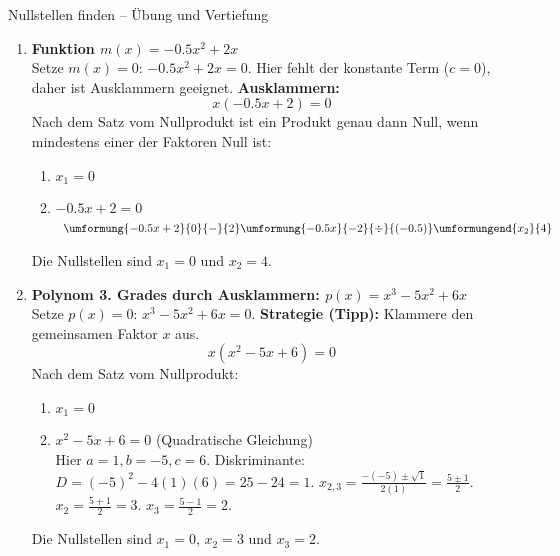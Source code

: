 \begin{loesungsumgebung}{Nullstellen finden – Übung und Vertiefung}
\begin{enumerate}[label=(\alph*)]
    \item \textbf{Funktion $m(x) = -0.5x^2 + 2x$} \\
    Setze $m(x)=0$: $-0.5x^2 + 2x = 0$. Hier fehlt der konstante Term ($c=0$), daher ist Ausklammern geeignet.
    \textbf{Ausklammern:}
    $$ x(-0.5x + 2) = 0 $$
    Nach dem Satz vom Nullprodukt ist ein Produkt genau dann Null, wenn mindestens einer der Faktoren Null ist:
    \begin{enumerate}
        \item $x_1 = 0$
        \item $-0.5x + 2 = 0$
            $$
            \begin{array}{r c l c l}
            \umformung{-0.5x + 2}{0}{-}{2}
            \umformung{-0.5x}{-2}{\div}{(-0.5)}
            \umformungend{x_2}{4}
            \end{array}
            $$
    \end{enumerate}
    Die Nullstellen sind $x_1=0$ und $x_2=4$.

    \item \textbf{Polynom 3. Grades durch Ausklammern: $p(x) = x^3 - 5x^2 + 6x$} \\
    Setze $p(x)=0$: $x^3 - 5x^2 + 6x = 0$.
    \textbf{Strategie (Tipp):} Klammere den gemeinsamen Faktor $x$ aus.
    $$ x(x^2 - 5x + 6) = 0 $$
    Nach dem Satz vom Nullprodukt:
    \begin{enumerate}
        \item $x_1 = 0$
        \item $x^2 - 5x + 6 = 0$ (Quadratische Gleichung) \\
        Hier $a=1, b=-5, c=6$.
        Diskriminante: $D = (-5)^2 - 4(1)(6) = 25 - 24 = 1$.
        $x_{2,3} = \frac{-(-5) \pm \sqrt{1}}{2(1)} = \frac{5 \pm 1}{2}$.
        $x_2 = \frac{5+1}{2} = 3$.
        $x_3 = \frac{5-1}{2} = 2$.
    \end{enumerate}
    Die Nullstellen sind $x_1=0$, $x_2=3$ und $x_3=2$.


\end{enumerate}
\end{loesungsumgebung}
